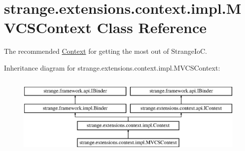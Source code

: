 \hypertarget{classstrange_1_1extensions_1_1context_1_1impl_1_1_m_v_c_s_context}{\section{strange.\-extensions.\-context.\-impl.\-M\-V\-C\-S\-Context Class Reference}
\label{classstrange_1_1extensions_1_1context_1_1impl_1_1_m_v_c_s_context}
}


The recommended \hyperlink{classstrange_1_1extensions_1_1context_1_1impl_1_1_context}{Context} for getting the most out of Strange\-Io\-C.  


Inheritance diagram for strange.\-extensions.\-context.\-impl.\-M\-V\-C\-S\-Context\-:\begin{figure}[H]
\begin{center}
\leavevmode
\includegraphics[height=4.000000cm]{classstrange_1_1extensions_1_1context_1_1impl_1_1_m_v_c_s_context}
\end{center}
\end{figure}
